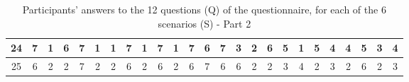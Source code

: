 \begin{sidewaystable}[]
\begin{tabular}{|c|c|c|c|c|c|c|c|c|c|c|c|c|c|c|c|c|c|c|c|c|c|c|c|c|}
    24      & 7                                               & 1                                               & 6                                               & 7                                               & 1                                               & 1                                               & 7                                               & 1                                               & 7                                               & 1                                                & 7                                                & 6                                                & 7                                               & 3                                               & 2                                               & 6                                               & 5                                               & 1                                               & 5                                               & 4                                               & 4                                               & 5                                                & 3                                                & 4                                                \\ \hline
    25      & 6                                               & 2                                               & 2                                               & 7                                               & 2                                               & 2                                               & 6                                               & 2                                               & 6                                               & 2                                                & 6                                                & 7                                                & 6                                               & 6                                               & 2                                               & 2                                               & 3                                               & 4                                               & 2                                               & 3                                               & 2                                               & 6                                                & 2                                                & 3                                                \\ \hline
    \end{tabular}
    \caption{Participants' answers to the 12 questions (Q) of the questionnaire, for each of the 6 scenarios (S) - Part 2}
    \label{tab:ap:answers_2}
\end{sidewaystable}

